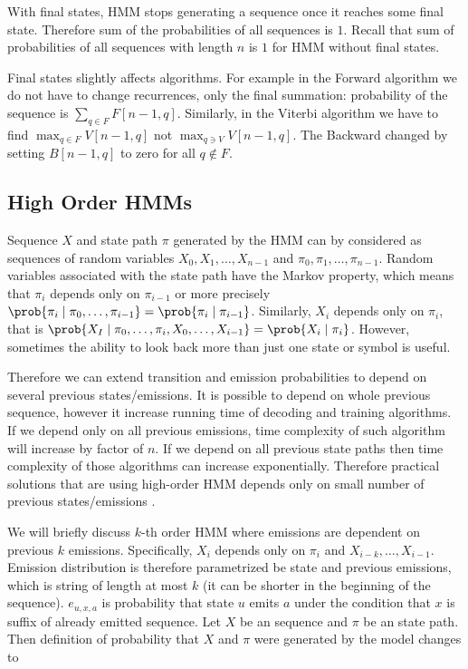 With final states, HMM stops generating a sequence once it reaches some final
state. Therefore sum of the probabilities of all sequences is $1$. Recall
that sum of probabilities of all sequences with length $n$ is $1$ for HMM
without final states.

Final states slightly affects algorithms. For example in the Forward algorithm we do
not have to change recurrences, only the final summation: probability of the sequence is $\sum_{q\in F}F[n-1,q]$. 
Similarly, in the Viterbi algorithm
we have to find $\max_{q\in F} V[n-1,q]$ not $\max_{q\ni V} V[n-1,q]$. 
The Backward changed by setting $B[n-1,q]$ to zero for all $q\notin F$.

\subsection{High Order HMMs}

Sequence $X$ and state path $\pi$ generated by the HMM can by considered 
as sequences of random variables
$X_0,X_1,\dots, X_{n-1}$ and $\pi_0,\pi_1,\dots,\pi_{n-1}$.
Random variables associated with the state path have the Markov
property\cite{Levin2006}, which means that $\pi_i$ depends only on $\pi_{i-1}$ or
more precisely
$\prob{\pi_i\mid\pi_0,\dots,\pi_{i-1}}=\prob{\pi_i\mid\pi_{i-1}}$. Similarly,
$X_i$ depends only on $\pi_i$, that is
$\prob{X_I\mid\pi_0,\dots,\pi_i,X_0,\dots,X_{i-1}}=\prob{X_i\mid\pi_i}$.
However,
sometimes the  ability to look back more than just one state or symbol is useful.

Therefore we can extend transition and emission probabilities to depend on
several previous states/emissions. It is possible to depend on whole previous
sequence, however it increase running time of decoding and training algorithms.
If we depend only on all previous emissions, time complexity of such algorithm
will increase by factor of $n$. If we depend on all previous state paths then
time complexity of those algorithms can increase exponentially.  Therefore
practical solutions that are using high-order HMM depends only on small number
of previous states/emissions \cite{Brejova2005,dalsie}.

We will briefly discuss $k$-th order HMM where emissions are dependent on
previous $k$ emissions. Specifically, $X_i$ depends only on $\pi_i$ and
$X_{i-k},\dots,X_{i-1}$. Emission distribution is therefore parametrized be
state and previous emissions, which is string of length at most $k$ (it can be
shorter in the beginning of the sequence). $e_{u,x,a}$ is probability that
state $u$ emits $a$ under the condition that $x$ is suffix of already emitted
sequence. Let $X$ be an sequence and $\pi$ be an state path. Then definition
of probability that $X$ and $\pi$ were generated by the model changes to

